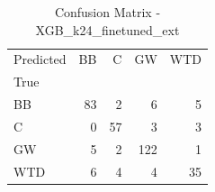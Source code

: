 \begin{table}
\caption{Confusion Matrix - XGB_k24_finetuned_ext}
\begin{tabular}{lrrrr}
\toprule
Predicted & BB & C & GW & WTD \\
True &  &  &  &  \\
\midrule
BB & 83 & 2 & 6 & 5 \\
C & 0 & 57 & 3 & 3 \\
GW & 5 & 2 & 122 & 1 \\
WTD & 6 & 4 & 4 & 35 \\
\bottomrule
\end{tabular}
\end{table}
